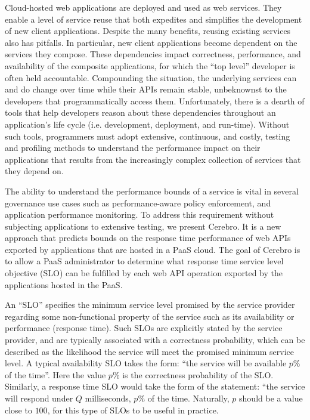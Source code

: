 Cloud-hosted web applications are deployed and used as web services. 
They enable a level of service reuse that both expedites
and simplifies the development of new client applications.
Despite the many benefits, reusing existing services also has pitfalls.  
In particular, new client applications become dependent on the 
services they compose.  These dependencies
impact correctness, performance, and availability of the composite 
applications, for which the ``top level'' developer is often held accountable.  
Compounding the situation, the underlying services can and do change over time
while their APIs remain stable,
unbeknownst to the developers that programmatically access them.
Unfortunately, there is a dearth of tools that help developers reason about these 
dependencies throughout an application's 
life cycle (i.e. development, deployment, and run-time).  Without such tools, 
programmers must adopt extensive, continuous, and costly, testing and profiling methods
to understand the performance impact on their applications
that results from the increasingly complex collection of
services that they depend on. 

The ability to understand the performance bounds
of a service is vital in several governance use cases such as
performance-aware policy enforcement, and application performance monitoring.
To address this requirement without subjecting applications to extensive
testing, we present Cerebro. It is a new approach that 
predicts bounds on the response time performance of web
APIs exported by applications that are hosted in a PaaS cloud.
The goal of Cerebro is to allow 
a PaaS administrator to determine what response time service level objective (SLO) can be
fulfilled by each web API operation exported by the applications
hosted in the PaaS.

An ``SLO'' specifies the minimum service level promised by the
service provider regarding some non-functional property of the service such as
its availability or performance (response time). 
Such SLOs are explicitly
stated by the service provider, and are typically associated with a correctness probability,
which can be described as the likelihood the service will meet the promised
minimum service level. A typical availability SLO
takes the form: ``the service will be available $p\%$ of the time''.
Here the value $p\%$ is the correctness probability of the SLO. Similarly, a
response time SLO would take the form of the statement: ``the service will respond 
under $Q$ milliseconds, $p\%$ of the time. Naturally, $p$ should be a value close
to $100$, for this type of SLOs to be useful in practice.

